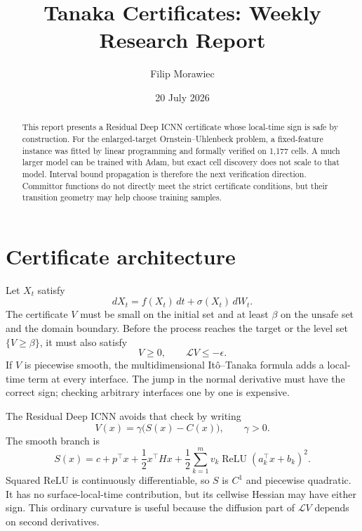 \documentclass[10pt]{extarticle}
\title{Tanaka Certificates: Weekly Research Report}
\author{Filip Morawiec}
\date{20 July 2026}
\begin{document}
\maketitle

\begin{abstract}
This report presents a Residual Deep ICNN certificate whose local-time sign is
safe by construction.  For the enlarged-target Ornstein--Uhlenbeck problem, a
fixed-feature instance was fitted by linear programming and formally verified
on 1,177 cells.  A much larger model can be trained with Adam, but exact cell
discovery does not scale to that model.  Interval bound propagation is
therefore the next verification direction.  Committor functions do not
directly meet the strict certificate conditions, but their transition geometry
may help choose training samples.
\end{abstract}

\tableofcontents

\section{Certificate architecture}

Let $X_t$ satisfy
\begin{equation}
  dX_t=f(X_t)\,dt+\sigma(X_t)\,dW_t.
\end{equation}
The certificate $V$ must be small on the initial set and at least $\beta$ on
the unsafe set and the domain boundary.  Before the process reaches the target
or the level set $\{V\geq\beta\}$, it must also satisfy
\begin{equation}
  V\geq0,
  \qquad
  \mathcal LV\leq-\epsilon.
\end{equation}
If $V$ is piecewise smooth, the multidimensional It\^o--Tanaka formula adds a
local-time term at every interface.  The jump in the normal derivative must
have the correct sign; checking arbitrary interfaces one by one is expensive.

The Residual Deep ICNN avoids that check by writing
\begin{equation}
  \boxed{V(x)=\gamma\bigl(S(x)-C(x)\bigr)},
  \qquad \gamma>0.
\end{equation}
The smooth branch is
\begin{equation}
  S(x)=c+p^\top x+\frac12x^\top Hx
  +\frac12\sum_{k=1}^{m}v_k
  \operatorname{ReLU}(a_k^\top x+b_k)^2.
\end{equation}
Squared ReLU is continuously differentiable, so $S$ is $C^1$ and piecewise
quadratic.  It has no surface-local-time contribution, but its cellwise
Hessian may have either sign.  This ordinary curvature is useful because the
diffusion part of $\mathcal L V$ depends on second derivatives.
\end{document}
